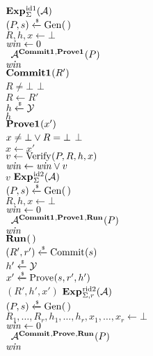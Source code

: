 \documentclass{article}
\theoremstyle{remark}
\begin{document}
\begin{figure}
  {
    \fu $\Exp{\id1}_{\Sigma}(\A)$\\[2pt]
      \li $(P,s)\getsr\gen(\,)$\\
      \li $R, h, x \gets \bot$\\
      \li $\win \gets 0$\\\
      \li $\A^{\COMMIT1,\PROVE1}(P)$\\
      \li \rreturn $\win$
    \\[6pt]
    \fu $\COMMIT1(R')$\\[2pt]
      \li \rif $R\ne\bot$ \rthen \rreturn $\bot$\\
      \li $R \gets R'$\\
      \li $h \getsr \Y$\\
      \li \rreturn $h$
    \\[6pt]
    \fu $\PROVE1(x')$\\[2pt]
      \li \rif $x\ne\bot \bor R=\bot$ \rthen \rreturn $\bot$\\
      \li $x \gets x'$\\
      \li $v \gets \verify(P,R,h,x)$\\
      \li $\win \gets \win \bor v$\\
      \li \rreturn $v$
  }
  {
    \fu $\Exp{\id2}_{\Sigma}(\A)$\\[2pt]
      \li $(P,s)\getsr\gen(\,)$\\
      \li $R, h, x \gets \bot$\\
      \li $\win \gets 0$\\\
      \li $\A^{\COMMIT1,\PROVE1,\RUN}(P)$\\
      \li \rreturn $\win$
    \\[6pt]
    \fu $\RUN(\,)$\\[2pt]
      \li $(R',r') \getsr \commit(s)$\\
      \li $h' \getsr \Y$\\
      \li $x' \getsr \prove(s,r',h')$\\
      \li \rreturn $(R',h',x')$
  }
  {
    \fu $\Exp{r\id2}_{\Sigma,r}(\A)$\\[2pt]
      \li $(P,s)\getsr\gen(\,)$\\
      \li $R_1, \ldots, R_r, h_1, \ldots, h_r, x_1, \ldots, x_r \gets \bot$\\
      \li $\win \gets 0$\\\
      \li $\A^{\COMMIT{},\PROVE{},\RUN}(P)$\\
      \li \rreturn $\win$
    \\[6pt]
}
\end{figure}
\end{document}
